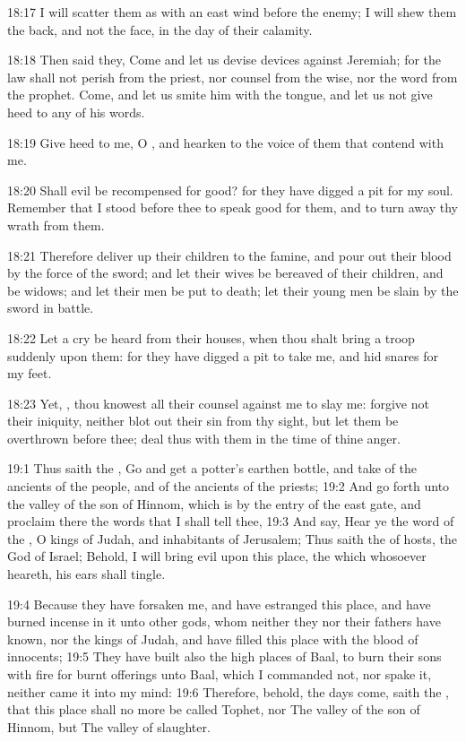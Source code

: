 18:17 I will scatter them as with an east wind before the enemy; I will shew them the back, and not the face, in the day of their calamity.

18:18 Then said they, Come and let us devise devices against Jeremiah; for the law shall not perish from the priest, nor counsel from the wise, nor the word from the prophet. Come, and let us smite him with the tongue, and let us not give heed to any of his words.

18:19 Give heed to me, O \LORD, and hearken to the voice of them that contend with me.

18:20 Shall evil be recompensed for good? for they have digged a pit for my soul. Remember that I stood before thee to speak good for them, and to turn away thy wrath from them.

18:21 Therefore deliver up their children to the famine, and pour out their blood by the force of the sword; and let their wives be bereaved of their children, and be widows; and let their men be put to death; let their young men be slain by the sword in battle.

18:22 Let a cry be heard from their houses, when thou shalt bring a troop suddenly upon them: for they have digged a pit to take me, and hid snares for my feet.

18:23 Yet, \LORD, thou knowest all their counsel against me to slay me: forgive not their iniquity, neither blot out their sin from thy sight, but let them be overthrown before thee; deal thus with them in the time of thine anger.

19:1 Thus saith the \LORD, Go and get a potter's earthen bottle, and take of the ancients of the people, and of the ancients of the priests; 19:2 And go forth unto the valley of the son of Hinnom, which is by the entry of the east gate, and proclaim there the words that I shall tell thee, 19:3 And say, Hear ye the word of the \LORD, O kings of Judah, and inhabitants of Jerusalem; Thus saith the \LORD of hosts, the God of Israel; Behold, I will bring evil upon this place, the which whosoever heareth, his ears shall tingle.

19:4 Because they have forsaken me, and have estranged this place, and have burned incense in it unto other gods, whom neither they nor their fathers have known, nor the kings of Judah, and have filled this place with the blood of innocents; 19:5 They have built also the high places of Baal, to burn their sons with fire for burnt offerings unto Baal, which I commanded not, nor spake it, neither came it into my mind: 19:6 Therefore, behold, the days come, saith the \LORD, that this place shall no more be called Tophet, nor The valley of the son of Hinnom, but The valley of slaughter.

